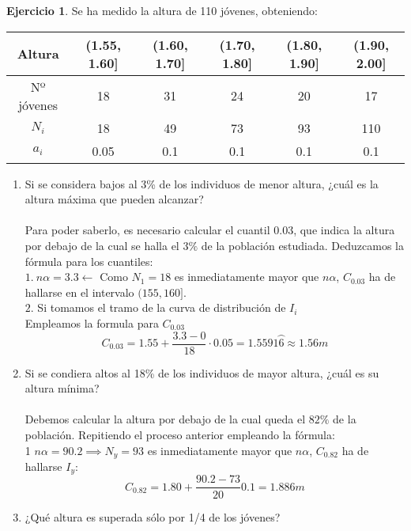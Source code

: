\documentclass[a4paper, 12pt]{article}
\theoremstyle{definition}
\newtheorem{ej}{Ejercicio}
\begin{document}
\begin{ej}
Se ha medido la altura de 110 jóvenes, obteniendo:

\begin{center}
    \begin{tabular}{|c|c|c|c|c|c|}
    \hline
    Altura & (1.55, 1.60] & (1.60, 1.70] & (1.70, 1.80] & (1.80, 1.90] & (1.90, 2.00] \\
    \hline
    Nº jóvenes & 18 & 31 & 24 & 20 & 17 \\
    \hline
     $N_{i}$ & 18 & 49 & 73 & 93 & 110 \\
    \hline
    $a_{i}$ & 0.05 & 0.1 & 0.1 & 0.1 & 0.1 \\
    \hline
    \end{tabular}
\end{center}

\begin{enumerate}[label=\textit{\alph*)}]
    \item Si se considera bajos al 3\% de los individuos de menor altura, ¿cuál es la altura máxima que pueden alcanzar?
    \\\\
    Para poder saberlo, es necesario calcular el cuantil $0.03$, que indica la altura por debajo de la cual se halla el $3\%$ de la población estudiada. Deduzcamos la fórmula para los cuantiles:
  \\ 
  $1. \ n\alpha = 3.3 \leftarrow$ Como $N_{1} = 18$ es inmediatamente mayor que $n\alpha$, $C_{0.03}$ ha de hallarse en el intervalo $(155,160]$. \\
    $2$. Si tomamos el tramo de la curva de distribución de $I_{i}$ 
    \\
    Empleamos la formula para $C_{0.03}$ 
    $$C_{0.03} = 1.55 + \frac{3.3 - 0}{18} \cdot 0.05 = 1.5591\wideparen{6} \approx 1.56 m$$
    \item Si se condiera altos al 18\% de los individuos de mayor altura, ¿cuál es su altura mínima? \\\\
    Debemos calcular la altura por debajo de la cual queda el $82\%$ de la población. Repitiendo el proceso anterior empleando la fórmula: 
    \\
    1 $n\alpha=90.2 \implies N_{y} = 93$ es inmediatamente mayor que $n\alpha$, $C_{0.82}$ ha de hallarse $I_{y}$:
    $$C_{0.82} = 1.80 + \frac{90.2 - 73}{20}0.1 = 1.886m$$
    \item ¿Qué altura es superada sólo por 1/4 de los jóvenes? \\\\

\end{enumerate}
\end{ej}
\end{document}
